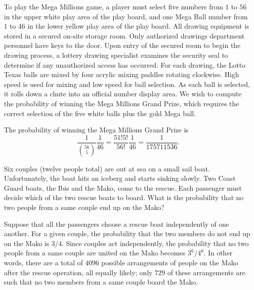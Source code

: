 \begin{example}
To play the Mega Millions game, a player must select five numbers from $1$ to $56$ in the upper white play area of the play board, and one Mega Ball number from $1$ to $46$ in the lower yellow play area of the play board.
All drawing equipment is stored in a secured on-site storage room.
Only authorized drawings department personnel have keys to the door.
Upon entry of the secured room to begin the drawing process, a lottery drawing specialist examines the security seal to determine if any unauthorized access has occurred.
For each drawing, the Lotto Texas balls are mixed by four acrylic mixing paddles rotating clockwise.
High speed is used for mixing and low speed for ball selection.
As each ball is selected, it rolls down a chute into an official number display area.
We wish to compute the probability of winning the Mega Millions Grand Prize, which requires the correct selection of the five white balls plus the gold Mega ball.

The probability of winning the Mega Millions Grand Prize is
\begin{equation*}
\frac{1}{\binom{56}{5}} \frac{1}{46}
= \frac{51!5!}{56!} \frac{1}{46}
= \frac{1}{175 711 536} .
\end{equation*}
\end{example}

\begin{example}
Six couples (twelve people total) are out at sea on a small sail boat.
Unfortunately, the boat hits an iceberg and starts sinking slowly.
Two Coast Guard boats, the Ibis and the Mako, come to the rescue.
Each passenger must decide which of the two rescue boats to board.
What is the probability that no two people from a same couple end up on the Mako?

Suppose that all the passengers choose a rescue boat independently of one another.
For a given couple, the probability that the two members do not end up on the Mako is $3/4$.
Since couples act independently, the probability that no two people from a same couple are united on the Mako becomes $3^6/4^6$.
In other words, there are a total of $4096$ possible arrangements of people on the Mako after the rescue operation, all equally likely;
only $729$ of these arrangements are such that no two members from a same couple board the Mako.
\end{example}

